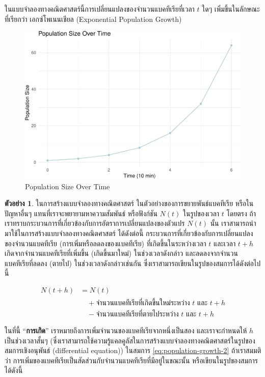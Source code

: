\documentclass[landscape, 20pt]{extarticle}
\theoremstyle{definition}
\newtheorem{example}{ตัวอย่าง}[section]
\theoremstyle{remark}
\begin{document}
ในแบบจำลองทางคณิตศาสตร์นี้การเปลี่ยนแปลงของจำนวนแบคทีเรียที่เวลา \(t\) ใดๆ เพิ่มขึ้นในลักษณะที่เรียกว่า เอกซ์โพเนนเชียล (Exponential Population Growth)

\begin{figure}
\centering
\includegraphics{population-plot-1.pdf}
\caption{\label{fig:population-plot}Population Size Over Time}
\end{figure}

\begin{example}
\protect\hypertarget{exm:exm2}{}\label{exm:exm2}ในการสร้างแบบจำลองทางคณิตศาสตร์ ในตัวอย่างของการขยายพันธ์แบคทีเรีย หรือในปัญหาอื่นๆ แทนที่เราจะพยายามหาความสัมพันธ์ หรือฟังก์ชัน \(N(t)\) ในรูปของเวลา \(t\) โดยตรง ถ้าเราทราบกระบวนการที่เกี่ยวข้องกับการอัตราการเปลี่ยนแปลงของตัวแปร \(N(t)\) นั้น เราสามารถนำมาใช้ในการสร้างแบบจำลองทางคณิตศาสตร์ ได้ดังต่อนี้ กระบวนการที่เกี่ยวข้องกับการเปลี่ยนแปลงของจำนวนแบคทีเรีย (การเพิ่มหรือลดลงของแบคทีเรีย) ที่เกิดขึ้นในระหว่างเวลา \(t\) และเวลา \(t + h\) เกิดจากจำนวนแบคทีเรียที่เพิ่มขึ้น (เกิดขึ้นมาใหม่) ในช่วงเวลาดังกล่าว และลดลงจากจำนวนแบคทีเรียที่ลดลง (ตายไป) ในช่วงเวลาดังกล่าวเช่นกัน ซึ่งเราสามารถเขียนในรูปของสมการได้ดังต่อไปนี้
\end{example}

\begin{align}
N(t + h) &= N(t) \\
&\quad + \text{จำนวนแบคทีเรียที่เกิดขึ้นใหม่ระหว่าง } t \text{ และ } t+h \\
&\quad - \text{จำนวนแบคทีเรียที่ตายไประหว่าง } t \text{ และ } t+h
\label{eq:population-growth-2}
\end{align}

ในที่นี้ ``\textbf{การเกิด}'' เราหมายถึงการเพิ่มจำนวนของแบคทีเรียจากหนึ่งเป็นสอง และเราจะกำหนดให้ \(h\) เป็นช่วงเวลาสั้นๆ (ซึ่งเราสามารถใช้ความรู้แคลคูลัสในการสร้างแบบจำลองทางคณิตศาสตร์ในรูปของสมการเชิงอนุพันธ์ (differential equation)) ในสมการ \eqref{eq:population-growth-2} ถ้าเราสมมติว่า การเพิ่มของแบคทีเรียเป็นสัดส่วนกับจำนวนแบคทีเรียที่มีอยู่ในขณะนั้น หรือเขียนในรูปของสมการได้ดังนี้
\end{document}
